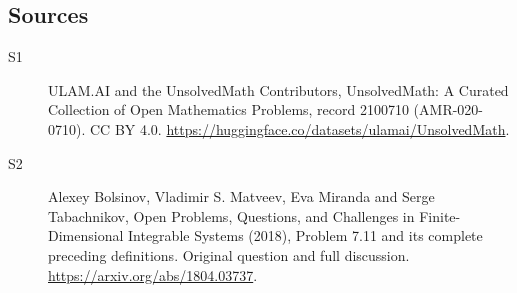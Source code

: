\documentclass[11pt]{article}
\begin{document}
\subsection{Sources}
\begin{description}
\item[\hypertarget{source:2100710:1}{S1}] ULAM.AI and the UnsolvedMath Contributors, UnsolvedMath: A Curated Collection of Open Mathematics Problems, record 2100710 (AMR-020-0710). CC BY 4.0. \url{https://huggingface.co/datasets/ulamai/UnsolvedMath}.
\item[\hypertarget{source:2100710:2}{S2}] Alexey Bolsinov, Vladimir S. Matveev, Eva Miranda and Serge Tabachnikov, Open Problems, Questions, and Challenges in Finite-Dimensional Integrable Systems (2018), Problem 7.11 and its complete preceding definitions. Original question and full discussion. \url{https://arxiv.org/abs/1804.03737}.

\end{description}
\label{end:2100710}
\end{document}
